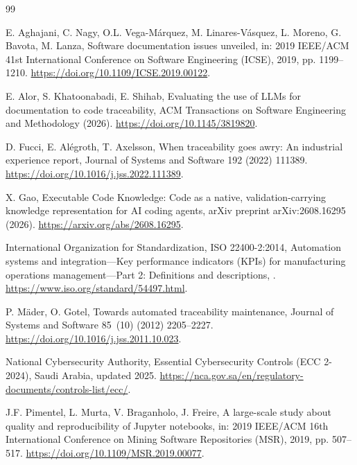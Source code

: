 \documentclass[a4paper,fleqn]{cas-dc}
\begin{document}
\begin{thebibliography}{99}


E. Aghajani, C. Nagy, O.L. Vega-M\'arquez, M. Linares-V\'asquez, L. Moreno, G. Bavota, M. Lanza,
\newblock Software documentation issues unveiled,
\newblock in: 2019 IEEE/ACM 41st International Conference on Software Engineering (ICSE), 2019, pp. 1199--1210.
\newblock \url{https://doi.org/10.1109/ICSE.2019.00122}.

E. Alor, S. Khatoonabadi, E. Shihab,
\newblock Evaluating the use of LLMs for documentation to code traceability,
\newblock ACM Transactions on Software Engineering and Methodology (2026).
\newblock \url{https://doi.org/10.1145/3819820}.

D. Fucci, E. Al\'egroth, T. Axelsson,
\newblock When traceability goes awry: An industrial experience report,
\newblock Journal of Systems and Software 192 (2022) 111389.
\newblock \url{https://doi.org/10.1016/j.jss.2022.111389}.

X. Gao,
\newblock Executable Code Knowledge: Code as a native, validation-carrying knowledge representation for AI coding agents,
\newblock arXiv preprint arXiv:2608.16295 (2026).
\newblock \url{https://arxiv.org/abs/2608.16295}.

International Organization for Standardization,
\newblock ISO 22400-2:2014, Automation systems and integration---Key performance indicators (KPIs) for manufacturing operations management---Part 2: Definitions and descriptions,
.
\newblock \url{https://www.iso.org/standard/54497.html}.

P. M\"ader, O. Gotel,
\newblock Towards automated traceability maintenance,
\newblock Journal of Systems and Software 85~(10) (2012) 2205--2227.
\newblock \url{https://doi.org/10.1016/j.jss.2011.10.023}.

National Cybersecurity Authority,
\newblock Essential Cybersecurity Controls (ECC 2-2024),
\newblock Saudi Arabia, updated 2025.
\newblock \url{https://nca.gov.sa/en/regulatory-documents/controls-list/ecc/}.

J.F. Pimentel, L. Murta, V. Braganholo, J. Freire,
\newblock A large-scale study about quality and reproducibility of Jupyter notebooks,
\newblock in: 2019 IEEE/ACM 16th International Conference on Mining Software Repositories (MSR), 2019, pp. 507--517.
\newblock \url{https://doi.org/10.1109/MSR.2019.00077}.


\end{thebibliography}
\end{document}
